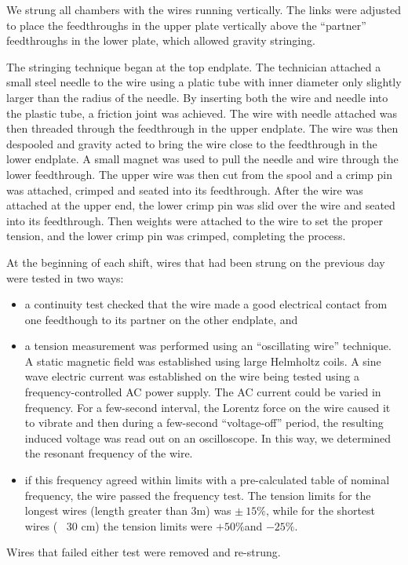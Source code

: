 We strung all chambers with 
the wires running vertically.  The links were adjusted to place the 
feedthroughs in the upper plate vertically above the ``partner''
feedthroughs in the lower plate, which allowed gravity stringing.

The stringing technique began at the top endplate.  The technician attached a 
small steel needle to the wire using a platic tube with inner diameter only
slightly larger than the radius of the needle.  By inserting both the wire and
needle into the plastic tube, a friction joint was achieved.  
The wire with needle attached was then threaded through the feedthrough in 
the upper endplate.  The wire was then despooled and gravity acted to bring the 
wire close to the feedthrough in the lower endplate.  A small magnet was 
used to pull the needle and wire through the lower feedthrough.  The upper wire
was then cut from the spool and a crimp pin was attached, crimped and seated into
its feedthrough.  After the wire was attached at the upper end, the lower 
crimp pin was slid over the wire and seated into its feedthrough.  Then 
weights were attached to the wire to set the 
proper tension, and the lower crimp pin was crimped, completing the process.

At the beginning of each shift, wires that had been strung on the previous day
were tested in two ways:
\begin{itemize}
\item a continuity test checked that the wire made a good electrical contact
from one feedthough to its partner on the other endplate, and
\item a tension measurement was performed using an ``oscillating wire'' technique.
A static magnetic field was established using large Helmholtz coils.  A sine
wave electric current was established on the wire being tested using a frequency-controlled 
AC power supply.  The AC current could be varied in frequency.  For a 
few-second interval, the Lorentz force on the wire caused it to vibrate and
then during a few-second ``voltage-off'' period, the resulting induced voltage
was read out on an oscilloscope.  In this way, we determined the resonant frequency
of the wire. 
\item if this frequency agreed within limits with a pre-calculated
table of nominal frequency, the wire passed the frequency test.  The tension limits for
the longest wires (length greater than 3m) was $\pm~15\%$, while for the shortest wires
(~ 30 cm) the tension limits were $+50\%$and $-25\%$.
\end{itemize}
Wires that failed either test were removed and re-strung.

